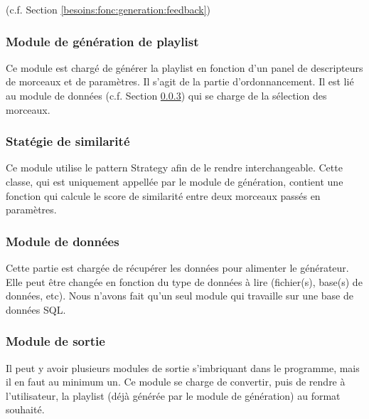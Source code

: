 (c.f. Section \ref{besoins:fonc:generation:feedback})

\subsubsection{Module de génération de playlist}
\label{besoins:nfonc:perf:mod:generator}

Ce module est chargé de générer la playlist en fonction d’un panel de 
descripteurs de morceaux et de paramètres. Il s'agit de la partie 
d'ordonnancement. Il est lié au module de données (c.f. Section 
\ref{besoins:nfonc:perf:mod:data}) qui se charge de la sélection des morceaux.

\subsubsection{Statégie de similarité}
\label{besoins:nfonc:perf:mod:similarity}

Ce module utilise le pattern Strategy afin de le rendre interchangeable. Cette 
classe, qui est uniquement appellée par le module de génération, contient une 
fonction qui calcule le score de similarité entre deux morceaux passés en 
paramètres.

\subsubsection{Module de données}
\label{besoins:nfonc:perf:mod:data}

Cette partie est chargée de récupérer les données pour alimenter le générateur. 
Elle peut être changée en fonction du type de données à lire (fichier(s), 
base(s) de données, etc). Nous n'avons fait qu’un seul module qui travaille 
sur une base de données SQL.

\subsubsection{Module de sortie}
\label{besoins:nfonc:perf:mod:out}

Il peut y avoir plusieurs modules de sortie s'imbriquant dans le programme, mais
il en faut au minimum un. Ce module se charge de convertir, puis de rendre à
l’utilisateur, la playlist (déjà générée par le module de génération) au 
format souhaité.

